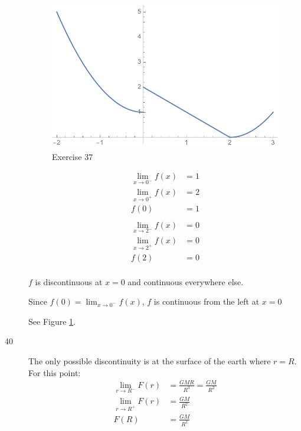 \documentclass[letterpaper, landscape]{exam}
\begin{document}
\begin{description}
        \begin{figure}[H]
          \centering
          \includegraphics[scale = 0.5]{ex37.pdf}
          \caption{Exercise 37}
          \label{fig:ex37}
        \end{figure}

        \begin{align*}
          \lim_{x \to 0^-} f(x) & = 1 \\
          \lim_{x \to 0^+} f(x) & = 2 \\
          f(0)                  & = 1 \\
          \\
          \lim_{x \to 2^-} f(x) & = 0 \\
          \lim_{x \to 2^+} f(x) & = 0 \\
          f(2)                  & = 0 \\
        \end{align*}

        $f$ is discontinuous at $x = 0$ and continuous everywhere else.

        Since $f(0) = \lim_{x \to 0^-} f(x)$, $f$ is continuous from the left at
        $x = 0$

        See Figure \ref{fig:ex37}.

      \item[40]
        The only possible discontinuity is at the surface of the earth where $r = R$. For this point:
        \begin{align*}
          \lim_{r \to R^-} F(r) & = \frac{GMR}{R^3} = \frac{GM}{R^2} \\
          \lim_{r \to R^+} F(r) & = \frac{GM}{R^2} \\
          F(R)                  & = \frac{GM}{R^2} \\
        \end{align*}


\end{description}
\end{document}
